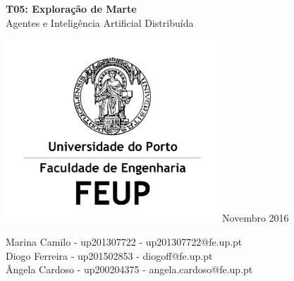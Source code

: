 \documentclass[12pt]{report}
\begin{document}
\newcommand{\sajas}{\texttt{SAJaS}\xspace}
\newcommand{\jade}{\texttt{JADE}\xspace}
\newcommand{\repast}{\texttt{Repast 3}\xspace}
\newcommand{\massim}{\texttt{MASSim2Dev}\xspace}
\newcommand{\java}{\texttt{JAVA}\xspace}
\newcommand{\acl}{\texttt{ACL}\xspace}
\newcommand{\fipa}{\texttt{FIPA}\xspace}
\newcommand{\spotter}{\emph{spotter}\xspace}
\newcommand{\Spotter}{\emph{Spotter}\xspace}
\newcommand{\spotters}{\emph{spotters}\xspace}
\newcommand{\Producer}{\emph{Producer}\xspace}
\newcommand{\producer}{\emph{producer}\xspace}
\newcommand{\producers}{\emph{producers}\xspace}
\newcommand{\Transporter}{\emph{Transporter}\xspace}
\newcommand{\transporter}{\emph{transporter}\xspace}
\newcommand{\transporters}{\emph{transporters}\xspace}


  \begin{titlepage}
    \begin{center}
        \vspace*{1cm}
        
        \Huge
        \textbf{T05: Exploração de Marte}
        \vspace{0.5cm} \ \\
        \LARGE
        Agentes e Inteligência Artificial Distribuída
        
        \vfill
        
	\includegraphics[width=0.6\textwidth]{FEUP_Logo}
	\break
        \small
        Novembro 2016
        
        \vfill
        
	\vspace{1.5cm}
        \normalsize{
	  Marina Camilo - up201307722 - up201307722@fe.up.pt \\
	  Diogo Ferreira - up201502853 - diogoff@fe.up.pt \\
	  Ângela Cardoso - up200204375 - angela.cardoso@fe.up.pt
        }
        
    \end{center}
  \end{titlepage}
\end{document}
